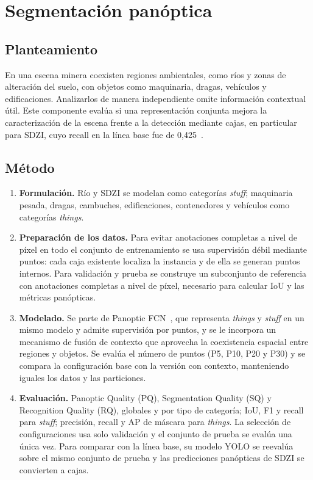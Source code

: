 \section{Segmentación panóptica}
\label{sec:panoptica}

\subsection{Planteamiento}
En una escena minera coexisten regiones ambientales, como ríos y zonas de alteración del suelo, con objetos como maquinaria, dragas, vehículos y edificaciones. Analizarlos de manera independiente omite información contextual útil. Este componente evalúa si una representación conjunta mejora la caracterización de la escena frente a la detección mediante cajas, en particular para SDZI, cuyo recall en la línea base fue de 0,425~\cite{acosta2025eyes}.

\subsection{Método}
\begin{enumerate}
    \item \textbf{Formulación.} Río y SDZI se modelan como categorías \textit{stuff}; maquinaria pesada, dragas, cambuches, edificaciones, contenedores y vehículos como categorías \textit{things}.
    \item \textbf{Preparación de los datos.} Para evitar anotaciones completas a nivel de píxel en todo el conjunto de entrenamiento se usa supervisión débil mediante puntos: cada caja existente localiza la instancia y de ella se generan puntos internos. Para validación y prueba se construye un subconjunto de referencia con anotaciones completas a nivel de píxel, necesario para calcular IoU y las métricas panópticas.
    \item \textbf{Modelado.} Se parte de Panoptic FCN~\cite{li2022panopticfcn}, que representa \textit{things} y \textit{stuff} en un mismo modelo y admite supervisión por puntos, y se le incorpora un mecanismo de fusión de contexto que aprovecha la coexistencia espacial entre regiones y objetos. Se evalúa el número de puntos (P5, P10, P20 y P30) y se compara la configuración base con la versión con contexto, manteniendo iguales los datos y las particiones.
    \item \textbf{Evaluación.} Panoptic Quality (PQ), Segmentation Quality (SQ) y Recognition Quality (RQ), globales y por tipo de categoría; IoU, F1 y recall para \textit{stuff}; precisión, recall y AP de máscara para \textit{things}. La selección de configuraciones usa solo validación y el conjunto de prueba se evalúa una única vez. Para comparar con la línea base, su modelo YOLO se reevalúa sobre el mismo conjunto de prueba y las predicciones panópticas de SDZI se convierten a cajas.
\end{enumerate}

